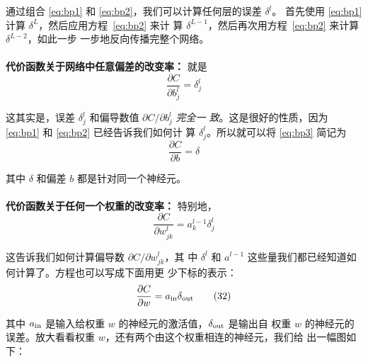 通过组合 \eqref{eq:bp1} 和 \eqref{eq:bp2}，我们可以计算任何层的误差 $\delta^l$。
首先使用 \eqref{eq:bp1} 计算 $\delta^L$，然后应用方程~\eqref{eq:bp2} 来计
算 $\delta^{L-1}$，然后再次用方程~\eqref{eq:bp2} 来计算 $\delta^{L-2}$，如此一步
一步地反向传播完整个网络。
\\
\\
\textbf{代价函数关于网络中任意偏差的改变率：} 就是
\begin{equation}
  \frac{\partial C}{\partial b^l_j} = \delta^l_j
  \label{eq:bp3}\tag{BP3}
\end{equation}

这其实是，误差 $\delta^l_j$ 和偏导数值 $\partial C / \partial b^l_j$ \emph{完全一
  致}。这是很好的性质，因为 \eqref{eq:bp1} 和 \eqref{eq:bp2} 已经告诉我们如何计
算 $\delta^l_j$。所以就可以将 \eqref{eq:bp3} 简记为
\begin{equation}
  \frac{\partial C}{\partial b} = \delta
  \label{eq:31}\tag{31}
\end{equation}

其中 $\delta$ 和偏差 $b$ 都是针对同一个神经元。
\\
\\
\textbf{代价函数关于任何一个权重的改变率：} 特别地，
\begin{equation}  
  \frac{\partial C}{\partial w^l_{jk}} = a^{l-1}_k \delta^l_j
  \label{eq:bp4}\tag{BP4}
\end{equation}

这告诉我们如何计算偏导数 $\partial C/\partial w_{jk}^l$，其
中 $\delta^l$ 和 $a^{l-1}$ 这些量我们都已经知道如何计算了。方程也可以写成下面用更
少下标的表示：
\begin{equation}
  \frac{\partial
    C}{\partial w} = a_{\rm in} \delta_{\rm out}
  \label{eq:32}\tag{32}
\end{equation}

其中 $a_{\rm in}$ 是输入给权重 $w$ 的神经元的激活值，$\delta_{\rm out}$ 是输出自
权重 $w$ 的神经元的误差。放大看看权重 $w$，还有两个由这个权重相连的神经元，我们给
出一幅图如下：

\begin{center}
\end{center}

